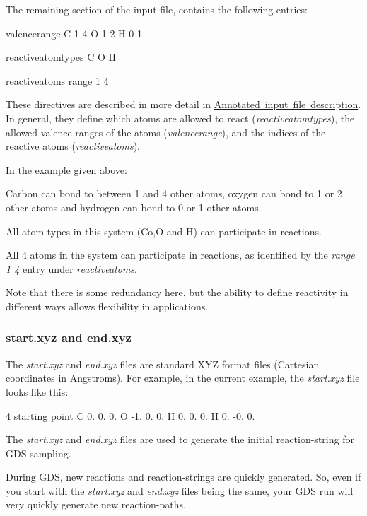 The remaining section of the input file, contains the following entries\+: \begin{DoxyVerb}valencerange{
C 1 4
O 1 2
H 0 1
}

reactiveatomtypes{  
C
O
H
}

reactiveatoms{  
range 1 4
}
\end{DoxyVerb}


These directives are described in more detail in \mbox{\hyperlink{_annotated}{Annotated input file description}}. In general, they define which atoms are allowed to react ({\itshape reactiveatomtypes}), the allowed valence ranges of the atoms ({\itshape valencerange}), and the indices of the reactive atoms ({\itshape reactiveatoms}).

In the example given above\+:


\begin{DoxyItemize}
\item Carbon can bond to between 1 and 4 other atoms, oxygen can bond to 1 or 2 other atoms and hydrogen can bond to 0 or 1 other atoms.
\item All atom types in this system (Co,O and H) can participate in reactions.
\item All 4 atoms in the system can participate in reactions, as identified by the {\itshape range 1 4} entry under {\itshape reactiveatoms}.
\end{DoxyItemize}

Note that there is some redundancy here, but the ability to define reactivity in different ways allows flexibility in applications.

\subsubsection*{start.\+xyz and end.\+xyz}

The {\itshape start.\+xyz} and {\itshape end.\+xyz} files are standard X\+YZ format files (Cartesian coordinates in Angstroms). For example, in the current example, the {\itshape start.\+xyz} file looks like this\+:

4 starting point C 0. 0. 0. O -\/1. 0. 0. H 0. 0. 0. H 0. -\/0. 0.

The {\itshape start.\+xyz} and {\itshape end.\+xyz} files are used to generate the initial reaction-\/string for G\+DS sampling.

During G\+DS, new reactions and reaction-\/strings are quickly generated. So, even if you start with the {\itshape start.\+xyz} and {\itshape end.\+xyz} files being the same, your G\+DS run will very quickly generate new reaction-\/paths.

